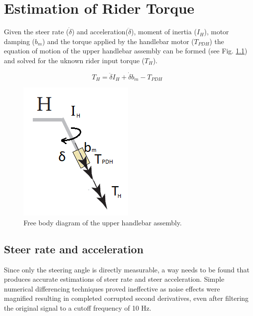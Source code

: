 \chapter{Estimation of Rider Torque}\label{app:C}

Given  the steer rate (\ensuremath{\dot{\delta}}) and acceleration(\ensuremath{\ddot{\delta}}), moment of inertia (\ensuremath{I_H}), motor damping  (\ensuremath{b_m}) and the torque applied by the handlebar motor (\ensuremath{T_{PDH}}) the equation of motion of the upper handlebar assembly can be formed (see Fig. \ref{fig:free_handle}) and solved for the uknown rider input torque (\ensuremath{T_H}).

\begin{equation}
    T_{H}= \ddot{\delta}I_H+\dot{\delta}b_{m} -T_{PDH} 
    \label{eq:torque_rider}
\end{equation}
\begin{figure}[h]
    \centering 
    \captionsetup{justification=centering,margin=2cm}

    \captionsetup{justification=centering,margin=2cm}
    \includegraphics[scale=0.9]{images/free_handle.png}
    \caption[Short title]{Free body diagram of the upper handlebar assembly. }
    \label{fig:free_handle}
\end{figure}

\section{Steer rate and acceleration} \label{sec:rateAccel}
Since only the steering angle is directly measurable, a way needs to be found that produces accurate estimations of steer rate and steer acceleration. Simple numerical differencing techniques proved ineffective as noise effects were magnified resulting in completed corrupted second derivatives, even after filtering the original signal to a cutoff frequency of 10 Hz. 

